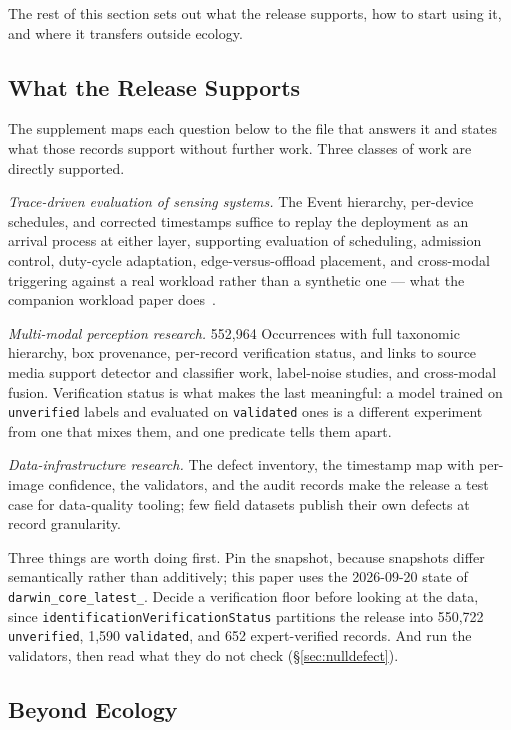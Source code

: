 \documentclass[sigconf]{acmart}
\begin{document}
The rest of this section sets out what the release supports, how to
start using it, and where it transfers outside ecology.

\subsection{What the Release Supports}

The supplement maps each question below to the file that answers it and
states what those records support without further work. Three classes
of work are directly supported.

\emph{Trace-driven evaluation of sensing systems.} The Event hierarchy,
per-device schedules, and corrected timestamps suffice to replay the
deployment as an arrival process at either layer, supporting evaluation
of scheduling, admission control, duty-cycle adaptation,
edge-versus-offload placement, and cross-modal triggering against a real
workload rather than a synthetic one --- what the companion workload
paper does~\cite{smartwilds_workload}.

\emph{Multi-modal perception research.} 552{,}964 Occurrences with full
taxonomic hierarchy, box provenance, per-record verification status, and
links to source media support detector and classifier work, label-noise
studies, and cross-modal fusion. Verification status is what makes the
last meaningful: a model trained on \texttt{unverified} labels and evaluated
on \texttt{validated} ones is a different experiment from one that mixes
them, and one predicate tells them apart.

\emph{Data-infrastructure research.} The defect inventory, the timestamp
map with per-image confidence, the validators, and the audit records
make the release a test case for data-quality tooling; few field
datasets publish their own defects at record granularity.



Three things are worth doing first. Pin the snapshot, because snapshots
differ semantically rather than additively; this paper uses the
2026-09-20 state of \texttt{darwin\_core\_\allowbreak latest\_}. Decide a verification floor before
looking at the data, since
\texttt{identification\allowbreak Verification\allowbreak Status} partitions the release into
550{,}722 \texttt{unverified}, 1{,}590 \texttt{validated}, and
652 expert-verified records. And run the validators, then read what
they do not check (\S\ref{sec:nulldefect}).

\subsection{Beyond Ecology}
\label{sec:beyond}
\end{document}
